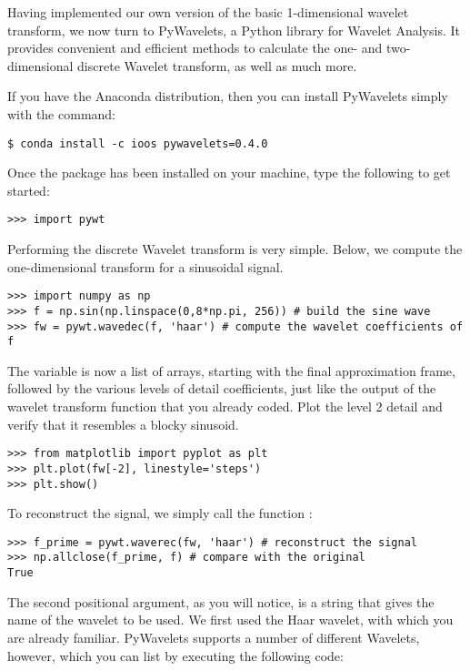 Having implemented our own version of the basic 1-dimensional wavelet transform, we now turn to
PyWavelets, a Python library for Wavelet Analysis.
It provides convenient and efficient methods to calculate the one- and two-dimensional discrete Wavelet
transform, as well as much more.

If you have the Anaconda distribution, then you can install PyWavelets simply with the command:

\begin{lstlisting}
$ conda install -c ioos pywavelets=0.4.0
\end{lstlisting}

Once the package has been installed on your machine, type the following to get started:

\begin{lstlisting}
>>> import pywt
\end{lstlisting}

Performing the discrete Wavelet transform is very simple.
Below, we compute the one-dimensional transform for a sinusoidal signal.

\begin{lstlisting}
>>> import numpy as np
>>> f = np.sin(np.linspace(0,8*np.pi, 256)) # build the sine wave
>>> fw = pywt.wavedec(f, 'haar') # compute the wavelet coefficients of f
\end{lstlisting}

The variable  is now a list of arrays, starting with the final approximation
frame, followed by the various levels of detail coefficients, just like the output
of the wavelet transform function that you already coded.
Plot the level 2 detail and verify that it resembles a blocky sinusoid.

\begin{lstlisting}
>>> from matplotlib import pyplot as plt
>>> plt.plot(fw[-2], linestyle='steps')
>>> plt.show()
\end{lstlisting}

To reconstruct the signal, we simply call the function :

\begin{lstlisting}
>>> f_prime = pywt.waverec(fw, 'haar') # reconstruct the signal
>>> np.allclose(f_prime, f) # compare with the original
True
\end{lstlisting}

The second positional argument, as you will notice, is a string that gives the name of the wavelet to be used.
We first used the Haar wavelet, with which you are already familiar.
PyWavelets supports a number of different Wavelets, however, which you can list by executing the following code:

